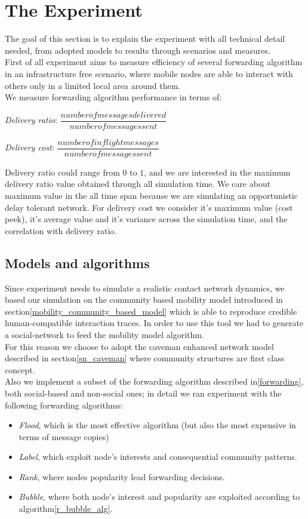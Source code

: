 \newpage
\section{The Experiment}
\label{experiment}

The goal of this section is to explain the experiment with all technical detail needed, from adopted models to results through scenarios and measures.\\
First of all experiment aims to measure efficiency of several forwarding algorithm in an infrastructure free scenario, where mobile nodes are able to interact with others only in a limited local area around them. \\
We measure forwarding algorithm performance in terms of:
\begin{list}{}
\item \emph{Delivery ratio}: $ \dfrac{number of messages delivered}{ number of messages sent } $ 
\item \emph{Delivery cost}:  $ \dfrac{number of inflight messages }{ number of messages sent } $
\end{list}
Delivery ratio could range from $0$ to $1$, and we are interested in the maximum delivery ratio value obtained through all simulation time. We care about maximum value in the all time span because we are simulating an opportunistic delay tolerant network. For delivery cost we consider it's maximum value (cost peek), it's average value and it's variance across the simulation time, and the correlation with delivery ratio.\\ 

\subsection{Models and algorithms}
\label{exp_incarnation}
Since experiment needs to simulate a realistic contact network dynamics, we based our simulation on the community based mobility model introduced in section\ref{mobility_community_based_model} which is able to reproduce credible human-compatible interaction traces. In order to use this tool we had to generate a social-network to feed the mobility model algorithm.\\
For this reason we choose to adopt the caveman enhanced network model described in section\ref{sn_caveman} where community structures are first class concept.\\
Also we implement a subset of the forwarding algorithm described in\ref{forwarding}, both social-based and non-social ones; in detail we ran experiment with the following forwarding algorithms:
\begin{itemize}
\item \emph{Flood}, which is the most effective algorithm (but also the most expensive in terms of message copies)
\item \emph{Label}, which exploit node's interests and consequential community patterns.
\item \emph{Rank}, where nodes popularity lead forwarding decisions.
\item \emph{Bubble}, where both node's interest and popularity are exploited according to algorithm\ref{r_bubble_alg}.
\end{itemize}

